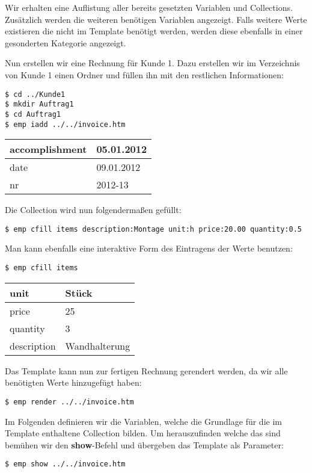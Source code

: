 Wir erhalten eine Auflistung aller bereits gesetzten Variablen und Collections. Zusätzlich werden die weiteren benötigen Variablen angezeigt. Falls weitere Werte existieren die nicht im Template benötigt werden, werden diese ebenfalls in einer gesonderten Kategorie angezeigt.

Nun erstellen wir eine Rechnung für Kunde 1. Dazu erstellen wir im Verzeichnis von Kunde 1 einen Ordner und füllen ihn mit den restlichen Informationen:

\begin{lstlisting}[style=Bash]
$ cd ../Kunde1
$ mkdir Auftrag1
$ cd Auftrag1
$ emp iadd ../../invoice.htm
\end{lstlisting}

\begin{tabular}{| l | l |}
	\hline
	accomplishment & 05.01.2012 \\
	\hline
	date & 09.01.2012 \\
	\hline
	nr & 2012-13 \\
	\hline
\end{tabular}

Die Collection wird nun folgendermaßen gefüllt:
\begin{lstlisting}[style=Bash]
$ emp cfill items description:Montage unit:h price:20.00 quantity:0.5
\end{lstlisting}

Man kann ebenfalls eine interaktive Form des Eintragens der Werte benutzen:
\begin{lstlisting}[style=Bash]
$ emp cfill items
\end{lstlisting}

\begin{tabular}{| l | l |}
	\hline
	unit & Stück \\
	\hline
	price & 25 \\
	\hline
	quantity & 3 \\
	\hline
	description & Wandhalterung \\
	\hline
\end{tabular}

Das Template kann nun zur fertigen Rechnung gerendert werden, da wir alle benötigten Werte hinzugefügt haben:
\begin{lstlisting}[style=Bash]
$ emp render ../../invoice.htm
\end{lstlisting}

Im Folgenden definieren wir die Variablen, welche die Grundlage für die im Template enthaltene Collection bilden. Um herauszufinden welche das sind bemühen wir den \textbf{show}-Befehl und übergeben das Template als Parameter:
\begin{lstlisting}[style=Bash]
$ emp show ../../invoice.htm
\end{lstlisting}

